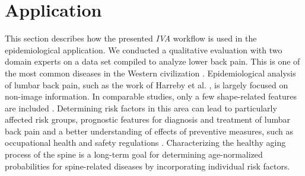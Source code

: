 \documentclass[journal]{style/vgtc} 			          %
\begin{document}
\section{Application} \label{application}
This section describes how the presented \emph{IVA} workflow is used in the epidemiological application.
%
We conducted a qualitative evaluation with two domain experts on a data set compiled to analyze lower back pain. 
%
This is one of the most common diseases in the Western civilization \cite{Backpain}.
%
Epidemiological analysis of lumbar back pain, such as the work of Harreby et al. \cite{Harreby1996}, is largely focused on non-image information.
%
In comparable studies, only a few shape-related features are included \cite{Lang2011}.
%
%
Determining risk factors in this area can lead to particularly affected risk groups, prognostic features for diagnosis and treatment of lumbar back pain and a better understanding of effects of preventive measures, such as occupational health and safety regulations \cite{Fletcher2012}.
%
Characterizing the healthy aging process of the spine is a long-term goal for determining age-normalized probabilities for spine-related diseases by incorporating individual risk factors.
%
\end{document}
